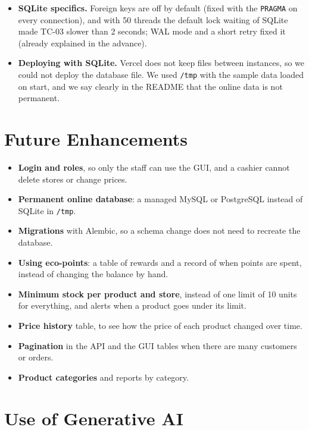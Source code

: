 \documentclass[11pt]{article}
\renewcommand{\_}{\oldus\allowbreak}
\begin{document}
\begin{itemize}[itemsep=0.3em]
  answers 409 if the new balance of a customer would go over 2,147,483,647, before saving anything.
  \item \textbf{SQLite specifics.} Foreign keys are off by default (fixed with the \texttt{PRAGMA}
  on every connection), and with 50 threads the default lock waiting of SQLite made TC-03 slower
  than 2 seconds; WAL mode and a short retry fixed it (already explained in the advance).
  \item \textbf{Deploying with SQLite.} Vercel does not keep files between instances, so we could
  not deploy the database file. We used \texttt{/tmp} with the sample data loaded on start, and we
  say clearly in the README that the online data is not permanent.
\end{itemize}

\section{Future Enhancements}

\begin{itemize}[itemsep=0.2em]
  \item \textbf{Login and roles}, so only the staff can use the GUI, and a cashier cannot delete
  stores or change prices.
  \item \textbf{Permanent online database}: a managed MySQL or PostgreSQL instead of SQLite in
  \texttt{/tmp}.
  \item \textbf{Migrations} with Alembic, so a schema change does not need to recreate the database.
  \item \textbf{Using eco-points}: a table of rewards and a record of when points are spent, instead
  of changing the balance by hand.
  \item \textbf{Minimum stock per product and store}, instead of one limit of 10 units for everything,
  and alerts when a product goes under its limit.
  \item \textbf{Price history} table, to see how the price of each product changed over time.
  \item \textbf{Pagination} in the API and the GUI tables when there are many customers or orders.
  \item \textbf{Product categories} and reports by category.
\end{itemize}

\section{Use of Generative AI}
\end{document}
